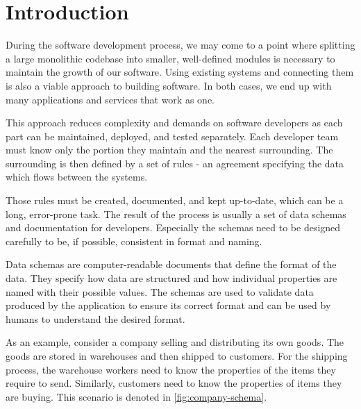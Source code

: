 \chapter*{Introduction}


During the software development process, we may come to a point where splitting a large monolithic codebase into smaller, well-defined modules is necessary to maintain the growth of our software. Using existing systems and connecting them is also a viable approach to building software. \cite{newman_monolith_nodate} In both cases, we end up with many applications and services that work as one.

This approach reduces complexity and demands on software developers as each part can be maintained, deployed, and tested separately. Each developer team must know only the portion they maintain and the nearest surrounding. The surrounding is then defined by a set of rules - an agreement specifying the data which flows between the systems.

Those rules must be created, documented, and kept up-to-date, which can be a long, error-prone task. The result of the process is usually a set of data schemas and documentation for developers. Especially the schemas need to be designed carefully to be, if possible, consistent in format and naming.

Data schemas are computer-readable documents that define the format of the data. They specify how data are structured and how individual properties are named with their possible values. The schemas are used to validate data produced by the application to ensure its correct format and can be used by humans to understand the desired format.

\medskip

As an example, consider a company selling and distributing its own goods. The goods are stored in warehouses and then shipped to customers. For the shipping process, the warehouse workers need to know the properties of the items they require to send. Similarly, customers need to know the properties of items they are buying. This scenario is denoted in \autoref{fig:company-schema}.

